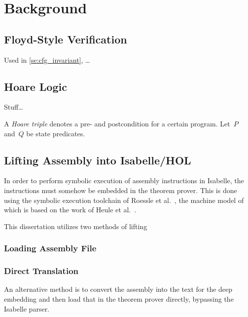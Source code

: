 \chapter{Background}\label{ch:background} 
\section{Floyd-Style Verification}\label{ch:floyd}
%
Used in \cref{se:cfg_invariant},
\dots

\section{Hoare Logic}
Stuff\dots~\citep{hoare1969axiomatic,myreen2007hoare}%

A \emph{Hoare triple} denotes a pre- and postcondition for a certain program.%
Let~$P$ and~$Q$ be state predicates.

\section{Lifting Assembly into Isabelle/HOL}
%

In order to perform symbolic execution of assembly instructions in Isabelle,
the instructions must somehow be embedded in the theorem prover.
This is done using the symbolic execution toolchain
of Roessle et al.~\citep{roessle2019},
the machine model of which is based on the work of Heule et al.~\citep{heule2016}.%

%
%

This dissertation utilizes two methods of lifting 

\subsection{Loading Assembly File}\label{sse:loading_assembly}

\subsection{Direct Translation}\label{sse:direct_translation}
An alternative method is to convert the assembly into the text for the deep embedding
and then load that in the theorem prover directly,
bypassing the Isabelle parser.
